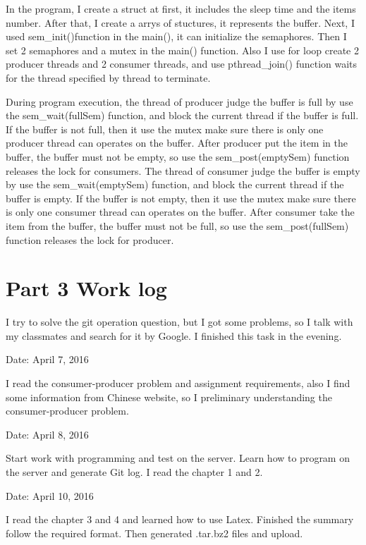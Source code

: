 \documentclass[10pt,draftclsnofoot,peerreview,letterpaper,onecolumn,]{IEEEtran}
\begin{document}
In the program, I create a struct at first, it includes the sleep time and the items number. After that, I create a arrys of stuctures, it represents the buffer. Next, I used sem\_init()function in the main(), it can initialize the semaphores. Then I set 2 semaphores and a mutex in the main() function. Also I use for loop create 2 producer threads and 2 consumer threads, and use pthread\_join() function waits for the thread specified by thread to terminate.

During program execution, the thread of producer judge the buffer is full by use the sem\_wait(fullSem) function, and block the current thread if the buffer is full. If the buffer is not full, then it use the mutex make sure there is only one producer thread can operates on the buffer. After producer put the item in the buffer, the buffer must not be empty, so use the sem\_post(emptySem) function releases the lock for consumers. The thread of consumer judge the buffer is empty by use the sem\_wait(emptySem) function, and block the current thread if the buffer is empty. If the buffer is not empty, then it use the mutex make sure there is only one consumer thread can operates on the buffer. After consumer take the item from the buffer, the buffer must not be full, so use the sem\_post(fullSem) function releases the lock for producer.


\newpage
\section{Part 3 Work log}

I try to solve the git operation question, but I got some problems, so I talk with my classmates and search for it by Google. I finished this task in the evening.

Date: April 7, 2016

I read the consumer-producer problem and assignment requirements, also I find some information from Chinese website, so I preliminary understanding the consumer-producer problem.

Date: April 8, 2016

Start work with programming and test on the server. Learn how to program on the server and generate Git log. I read the chapter 1 and 2.

Date: April 10, 2016

I read the chapter 3 and 4 and learned how to use Latex. Finished the summary follow the required format. Then generated .tar.bz2 files and upload.
\end{document}
